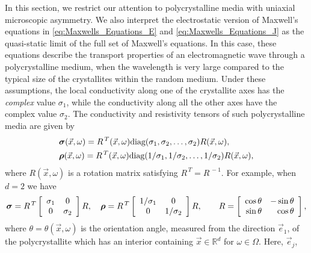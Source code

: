 \documentclass[11pt]{amsart}
\newcommand\bsig{\mbox{\boldmath${\sigma}$}}
\newcommand\brho{\mbox{\boldmath${\rho}$}}
\begin{document}
In this section, we restrict our attention to polycrystalline media
with uniaxial microscopic asymmetry. We also interpret the
electrostatic version of Maxwell's equations in
\eqref{eq:Maxwells_Equations_E} and \eqref{eq:Maxwells_Equations_J} as
the quasi-static limit of the full set of Maxwell's equations. In this
case, these equations describe the transport properties of an
electromagnetic wave through a polycrystalline medium, when the
wavelength is very large compared to the typical size of the crystallites
within the random medium. Under these assumptions, the local
conductivity along one of the crystallite axes has the \emph{complex}
value $\sigma_1$, while the conductivity along all the other axes have the
complex value $\sigma_2$. The conductivity and resistivity tensors of such
polycrystalline media are given by   
%
\begin{align}\label{eq:polycrystal_parameters}
  &\bsig(\vec{x},\omega)=R^{\,T}(\vec{x},\omega)\text{diag}(\sigma_1,\sigma_2,\ldots,\sigma_2)R(\vec{x},\omega),
  \\
  &\brho(\vec{x},\omega)=R^{\,T}(\vec{x},\omega)\text{diag}(1/\sigma_1,1/\sigma_2,\ldots,1/\sigma_2)R(\vec{x},\omega),
  \notag
\end{align}
%
where $R(\vec{x},\omega)$ is a rotation matrix satisfying
$R^{\,T}=R^{\,-1}$. For example, when $d=2$ we have 
%
\begin{align}\label{eq:polycrystal_parameters_2D}
  \bsig=R^{\,T}
  \left[
  \begin{array}{cc}
    \sigma_1& 0\\
    0 & \sigma_2\\
    \end{array}
    \right]
    R,
    \quad
    \brho=R^{\,T}
  \left[
  \begin{array}{cc}
    1/\sigma_1& 0\\
    0 & 1/\sigma_2\\
    \end{array}
    \right]
    R,
    \qquad
    R=
  \left[
  \begin{array}{rr}
    \cos\theta& -\sin\theta\\
    \sin\theta & \cos\theta\\
    \end{array}
    \right],
\end{align}
%
where $\theta=\theta(\vec{x},\omega)$ is the orientation angle, measured from the
direction $\vec{e}_1$, of the polycrystallite which has an interior 
containing $\vec{x}\in\mathbb{R}^d$ for $\omega\in\Omega$. Here, $\vec{e}_j$,
\end{document}
